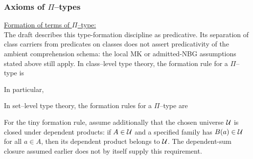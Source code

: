 \subsubsection{Axioms of $\Pi$--types}
\underline{Formation of terms of $\Pi$--type:}\\
The draft describes this type-formation discipline as predicative.
Its separation of class carriers from predicates on classes does not
assert predicativity of the ambient comprehension schema: the local MK
or admitted-NBG assumptions stated above still apply.
In class--level type theory, the formation rule for a $\Pi$--type is
\begin{prooftree}
\end{prooftree}
In particular,
\begin{prooftree}
\end{prooftree}
\begin{prooftree}
\end{prooftree}%
\begin{prooftree}
\end{prooftree}
In set--level type theory, the formation rules for a $\Pi$--type are
\begin{prooftree}
\end{prooftree}
\begin{prooftree}
\end{prooftree}
For the tiny formation rule, assume additionally that the chosen universe
$\mathcal{U}$ is closed under dependent products: if $A\in\mathcal{U}$ and a specified
family has $B(a)\in\mathcal{U}$ for all $a\in A$, then its dependent product
belongs to $\mathcal{U}$. The dependent-sum closure assumed earlier does not by
itself supply this requirement.
\begin{prooftree}
\end{prooftree}
